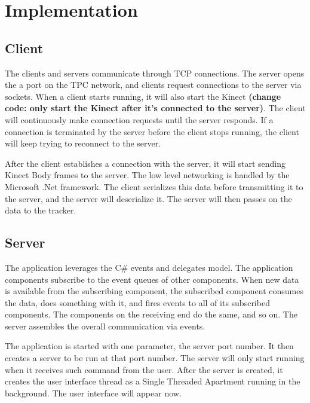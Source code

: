 


\chapter{Implementation}

\label{chapter:Implementation}

\section{Client}
\label{sec:implementation_client}

The clients and servers communicate through TCP connections. The server opens the a port on the TPC network, and clients request connections to the server via sockets. When a client starts running, it will also start the Kinect \textbf{(change code: only start the Kinect after it's connected to the server)}. The client will continuously make connection requests until the server responds. If a connection is terminated by the server before the client stops running, the client will keep trying to reconnect to the server.

After the client establishes a connection with the server, it will start sending Kinect Body frames to the server. The low level networking is handled by the Microsoft .Net framework. The client serializes this data before transmitting it to the server, and the server will deserialize it. The server will then passes on the data to the tracker.

\section{Server}
\label{sec:implementation_server}

The application leverages the C\# events and delegates model. The application components subscribe to the event queues of other components. When new data is available from the subscribing component, the subscribed component consumes the data, does something with it, and fires events to all of its subscribed components. The components on the receiving end do the same, and so on. The server assembles the overall communication via events.

The application is started with one parameter, the server port number. It then creates a server to be run at that port number. The server will only start running when it receives such command from the user. After the server is created, it creates the user interface thread as a Single Threaded Apartment running in the background. The user interface will appear now.


